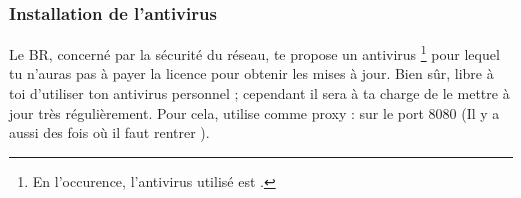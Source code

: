 








\subsubsection{Installation de l'antivirus}
\label{antivirus} Le BR, concern\'e par la s\'ecurit\'e du r\'eseau, te propose un antivirus \footnote{En
l'occurence, l'antivirus utilis\'e est .} pour lequel tu n'auras pas \`a
payer la licence pour obtenir les mises \`a jour. Bien s\^{u}r, libre \`a toi d'utiliser ton antivirus
personnel ; cependant il sera \`a ta charge de le mettre \`a jour tr\`es r\'eguli\`erement. Pour cela,
utilise comme proxy :  sur le port 8080 (Il y a aussi des fois o\`u il 
faut rentrer ).


